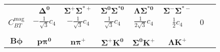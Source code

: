 \documentclass[preprintnumbers,prd,superscriptaddress,preprint]{revtex4-1}
\begin{document}
\begin{table}[b]
\begin{center}
{\begin{tabular}{c|ccccccc}
& \hspace*{0.1cm}$\bm{\Delta^0}$\hspace*{0.1cm}
& \hspace*{0.1cm}$\bm{\Sigma^+\Sigma^{*+}}$ \hspace*{0.1cm}
& \hspace*{0.1cm}$\bm{\Sigma^0\Sigma^{*0}}$\hspace*{0.1cm}
& \hspace*{0.1cm}$\bm{\Lambda\Sigma^{*0}}$\hspace*{0.1cm}
& \hspace*{0.1cm}$\bm{\Sigma^-\Sigma^{*-}}$\hspace*{0.1cm}
\\
\hspace*{0.1cm}$C_{BT}^{\text {mag}}$\hspace*{0.1cm}
& \hspace*{0.1cm}$-\frac{1}{\sqrt3}c_4$\hspace*{0.1cm}
& \hspace*{0.1cm}$-\frac{1}{\sqrt3}c_4$\hspace*{0.1cm}
& \hspace*{0.1cm}$\frac{1}{\sqrt3}c_4$\hspace*{0.1cm}
& \hspace*{0.1cm}$\frac{1}{2\sqrt3}c_4$\hspace*{0.1cm}
& \hspace*{0.1cm}$\frac12 c_4$\hspace*{0.1cm}
& \hspace*{0.1cm}$0$\hspace*{0.1cm}	
\\ 
&&&&&&& \\
\hline
&&&&&&& \\
\hspace*{0.1cm}$\bm{B\phi}$\hspace*{0.1cm}
& \hspace*{0.1cm}$\bm{p \pi^0}$\hspace*{0.1cm}
& \hspace*{0.1cm}$\bm{n \pi^+}$\hspace*{0.1cm}
& \hspace*{0.1cm}$\bm{\Sigma^+ K^0}$\hspace*{0.1cm}
& \hspace*{0.1cm}$\bm{\Sigma^0 K^+}$\hspace*{0.1cm}
& \hspace*{0.1cm}$\bm{\Lambda K^+}$\hspace*{0.1cm}	
\\

\end{tabular}}
\end{center}
\end{table}
\end{document}
